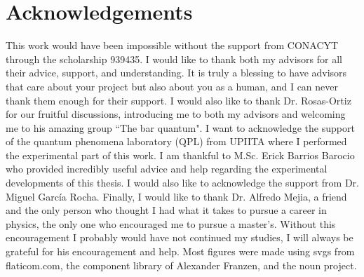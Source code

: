 \documentclass[12pt]{book}
\begin{document}

\chapter*{Acknowledgements}
\thispagestyle{plain}

This work would have been impossible without the support from CONACYT through the scholarship 939435. I would like to thank both my advisors for all their advice, support, and understanding. It is truly a blessing to have advisors that care about your project but also about you as a human, and I can never thank them enough for their support. I would also like to thank Dr. Rosas-Ortiz for our fruitful discussions, introducing me to both my advisors and welcoming me to his amazing group ``The bar quantum". I want to acknowledge the support of the quantum phenomena laboratory (QPL) from UPIITA where I performed the experimental part of this work. I am thankful to M.Sc. Erick Barrios Barocio who provided incredibly useful advice and help regarding the experimental developments of this thesis. I would also like to acknowledge the support from Dr. Miguel García Rocha. Finally, I would like to thank Dr. Alfredo Mejia, a friend and the only person who thought I had what it takes to pursue a career in physics, the only one who encouraged me to pursue a master's. Without this encouragement I probably would have not continued my studies, I will always be grateful for his encouragement and help. Most figures were made using svgs from flaticom.com, the component library of Alexander Franzen, and the noun project.
\end{document}
